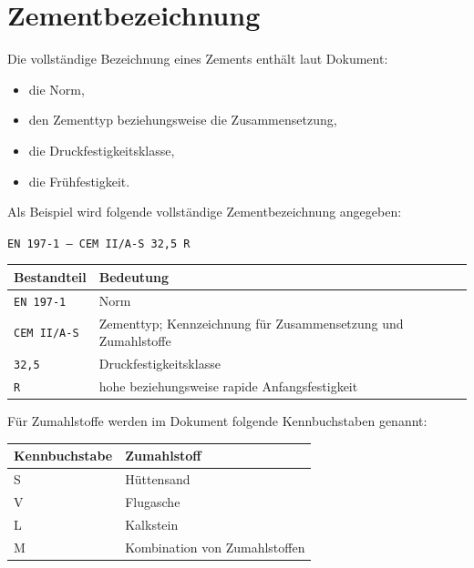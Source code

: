 \documentclass[
  12pt,
  a4paper,
  oneside
]{scrreprt}
\begin{document}
\section{Zementbezeichnung}

Die vollständige Bezeichnung eines Zements enthält laut Dokument:

\begin{itemize}
  \item die Norm,
  \item den Zementtyp beziehungsweise die Zusammensetzung,
  \item die Druckfestigkeitsklasse,
  \item die Frühfestigkeit.
\end{itemize}



Als Beispiel wird folgende vollständige Zementbezeichnung angegeben:

\begin{center}
\texttt{EN 197-1 -- CEM II/A-S 32,5 R}
\end{center}

\begin{longtable}{
  >{\raggedright\arraybackslash}p{}
  >{\raggedright\arraybackslash}p{}
}
\toprule
\textbf{Bestandteil} &
\textbf{Bedeutung} \\
\midrule
\endhead

\texttt{EN 197-1} &
Norm \\

\texttt{CEM II/A-S} &
Zementtyp; Kennzeichnung für Zusammensetzung und Zumahlstoffe \\

\texttt{32,5} &
Druckfestigkeitsklasse \\

\texttt{R} &
hohe beziehungsweise rapide Anfangsfestigkeit \\

\bottomrule
\end{longtable}



Für Zumahlstoffe werden im Dokument folgende Kennbuchstaben genannt:

\begin{longtable}{
  >{\centering\arraybackslash}p{}
  >{\raggedright\arraybackslash}p{}
}
\toprule
\textbf{Kennbuchstabe} &
\textbf{Zumahlstoff} \\
\midrule
\endhead

S & Hüttensand \\

V & Flugasche \\

L & Kalkstein \\

M & Kombination von Zumahlstoffen \\

\bottomrule
\end{longtable}
\end{document}
